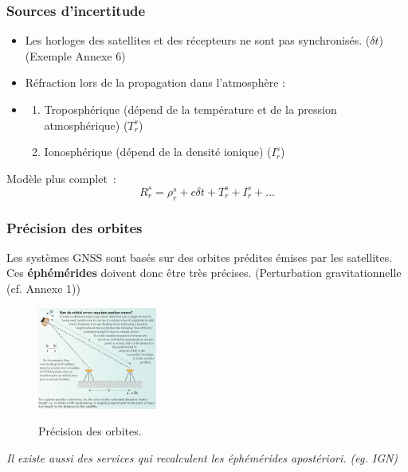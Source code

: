 \documentclass[xcolor=dvipsnames,envcountsect]{beamer}
\begin{document}
\begin{frame}
	\frametitle{Sources d'incertitude}
	\justifying
	\begin{itemize}
		\item Les horloges des satellites et des récepteurs ne sont pas synchronisés. ($\delta t$) {\tiny (Exemple Annexe 6)}
		\item Réfraction lors de la propagation dans l’atmosphère :
		\item \begin{enumerate}
			\item Troposphérique (dépend de la température et de la pression atmosphérique) ($T_r^s$)
			\item Ionosphérique (dépend de la densité ionique) ($I_r^s$)
		\end{enumerate}
	\end{itemize}
	Modèle plus complet :
	\begin{equation}
		\boxed{R_r^s = \rho_r^s + c\delta t + T_r^s + I_r^s + ...}
	\end{equation}
\end{frame}
\begin{frame}
	\frametitle{Précision des orbites}
	\justifying
	Les systèmes GNSS sont basés sur des orbites prédites émises par les satellites. \\
	Ces \textbf{éphémérides} doivent donc être très précises. {\small(Perturbation gravitationnelle (cf. Annexe 1))} \\
	\begin{figure}
		\centering
		\includegraphics[width=0.35\textwidth]{./Figures/ENS_gnss2.png} \\
		\caption {Précision des orbites. \cite{ens}}
	\end{figure}
	{\small	\textit{Il existe aussi des services qui recalculent les éphémérides apostériori. (eg. IGN)}}
\end{frame}
\end{document}
